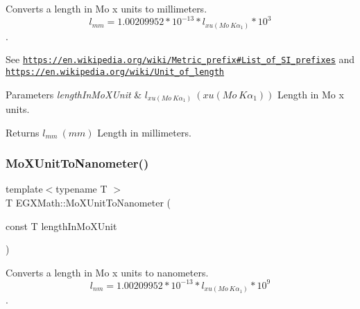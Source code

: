 Converts a length in Mo x units to millimeters. \[ l_{mm}=1.00209952*10^{-13} * l_{xu(Mo\ K\alpha_1)} * 10^{3} \]. 

See \href{https://en.wikipedia.org/wiki/Metric_prefix#List_of_SI_prefixes}{\tt https\+://en.\+wikipedia.\+org/wiki/\+Metric\+\_\+prefix\#\+List\+\_\+of\+\_\+\+S\+I\+\_\+prefixes} and \href{https://en.wikipedia.org/wiki/Unit_of_length}{\tt https\+://en.\+wikipedia.\+org/wiki/\+Unit\+\_\+of\+\_\+length} 
\begin{DoxyParams}{Parameters}
{\em length\+In\+Mo\+X\+Unit} & $ l_{xu(Mo\ K\alpha_1)}\ (xu(Mo\ K\alpha_1))$ Length in Mo x units. \\
\hline
\end{DoxyParams}
\begin{DoxyReturn}{Returns}
$ l_{mm}\ (mm)$ Length in millimeters. 
\end{DoxyReturn}
\mbox{\label{group___e_g_x_math-_conversions-_length_conversions-_non-_s_i-_mo_x_unit-_s_i_ga69668ee6be867c3f92e31f29ec2ae7fa}} 
\subsubsection{\texorpdfstring{Mo\+X\+Unit\+To\+Nanometer()}{MoXUnitToNanometer()}}
{\footnotesize\ttfamily template$<$typename T $>$ \\
T E\+G\+X\+Math\+::\+Mo\+X\+Unit\+To\+Nanometer (\begin{DoxyParamCaption}\item[{const T}]{length\+In\+Mo\+X\+Unit }\end{DoxyParamCaption})}



Converts a length in Mo x units to nanometers. \[ l_{nm}=1.00209952*10^{-13} * l_{xu(Mo\ K\alpha_1)} * 10^{9} \]. 

